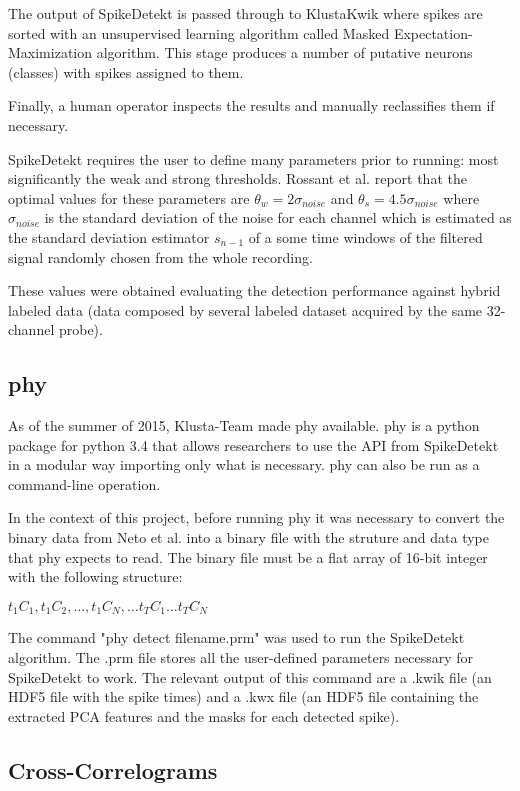 The output of SpikeDetekt is passed through to KlustaKwik where spikes are sorted with an unsupervised learning algorithm called Masked Expectation-Maximization algorithm. This stage produces a number of putative neurons (classes) with spikes assigned to them.

Finally, a human operator inspects the results and manually reclassifies them if necessary.

SpikeDetekt requires the user to define many parameters prior to running: most significantly the  weak and strong thresholds.  Rossant et al. report that the optimal values for these parameters are $\theta_w = 2 \sigma_{noise}$ and $\theta_s = 4.5 \sigma_{noise}$ where $\sigma_{noise}$ is the standard deviation of the noise for each channel which is estimated as the standard deviation estimator $s_{n-1}$ of a some time windows of the filtered signal randomly chosen from the whole recording.

These values were obtained evaluating the detection performance against hybrid labeled data (data composed by several labeled dataset acquired by the same 32-channel probe). 

\subsection{phy}
\label{subsec:phy}
As of the summer of 2015, Klusta-Team made phy available. phy is a python package for python 3.4 that allows researchers to use the API from SpikeDetekt in a modular way importing only what is necessary. phy can also be run as a command-line operation.

In the context of this project, before running phy it was necessary to convert the binary data from Neto et al. into a binary file with the struture and data type that phy expects to read. The binary file must be a flat array of 16-bit integer with the following structure:

$t_1C_1 , t_1C_2, \ldots , t_1C_N, \ldots t_TC_1 \ldots t_TC_N$ %

The command "phy detect filename.prm" was used to run the SpikeDetekt algorithm. The .prm file stores all the user-defined parameters necessary for SpikeDetekt to work. The relevant output of this command are a .kwik file (an HDF5 file with the spike times) and a .kwx file (an HDF5 file containing the extracted PCA features and the masks for each detected spike).

\subsection{Cross-Correlograms}
\label{subsec:CC}


